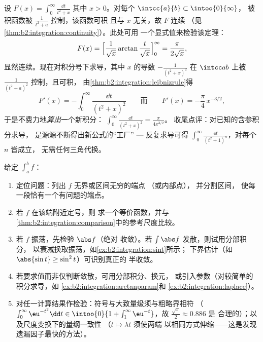 \begin{example}[含参积分的公式验证]\label{ex:b2:integration:arctanparam}
设 $F(x) = \displaystyle\int_0^\infty \frac{\dd t}{t^2 + x}$
其中 $x > 0$。对每个 $\intcc{a}{b} \subset \intoo{0}{\infty}$，
被积函数被 $\frac{1}{t^2 + a}$ 控制，该函数可积
且与 $x$ 无关，故 $F$ 连续
（见\cref{thm:b2:integration:continuity}）。此处可用
一个显式值来检验该定理：
\[
F(x) = \Bigl[\frac{1}{\sqrt x}\arctan\frac{t}{\sqrt
x}\Bigr]_0^\infty = \frac{\pi}{2\sqrt x} ,
\]
显然连续。现在对积分号下求导，其中
$x$ 的导数 $-\frac{1}{(t^2+x)^2}$ 在
$\intcc ab$ 上被 $\frac{1}{(t^2+a)^2}$ 控制，且可积，
由\cref{thm:b2:integration:leibnizrule}得
\[
F'(x) = -\int_0^\infty \frac{\dd t}{(t^2 + x)^2}
\qquad\text{而}\qquad
F'(x) = -\frac{\pi}{4}\,x^{-3/2} ,
\]
于是不费力地\emph{算出}一个新积分：
$\int_0^\infty\frac{\dd t}{(t^2+x)^2} = \frac{\pi}{4x^{3/2}}$。
收尾点评：对已知的含参积分求导，
是源源不断得出新公式的“工厂” --- 反复求导可得
$\int_0^\infty\frac{\dd t}{(t^2+1)^n}$，对每个 $n$ 皆成立，
无需任何三角代换。
\end{example}

\begin{method}[反常积分的研究]\label{met:b2:integration:study}
给定 $\int_a^b f$：
\begin{enumerate}
  \item 定位问题：列出 $f$ 无界或区间无穷的端点
        （或内部点），
        并分割区间，
        使每一段恰有一个有问题的端点。
  \item 若 $f$ 在该端附近定号，则
        求一个等价函数，并与
        \cref{thm:b2:integration:comparison}中的参考尺度比较。
  \item 若 $f$ 振荡，先检验 $\abs f$（绝对
        收敛）。若 $\int\abs f$ 发散，则试用分部积分，
        以衰减换取振荡，如\cref{ex:b2:integration:sint}所示；
        下界估计（如
        $\abs{\sin t} \geq \sin^2t$）可识别真正的
        半收敛。
  \item 若要求值而非仅判断敛散，可用分部积分、换元，
        或引入参数（对较简单的积分求导，如
        \cref{ex:b2:integration:arctanparam}和
        \cref{ex:b2:integration:laplace}）。
  \item 对任一计算结果作检验：符号与大致量级须与粗略界相符
        （$\int_0^\infty
        \eu^{-t^2}\dd t \in \intoo{0}{1 + \int_1^\infty
        \eu^{-t}}$，故 $\frac{\sqrt\pi}{2} \approx 0.886$ 是
        合理的）；以及尺度变换下的量纲一致性
        （$t \mapsto \lambda t$ 须使两端
        以相同方式伸缩——这是发现遗漏因子最快的方法）。
\end{enumerate}
\end{method}

